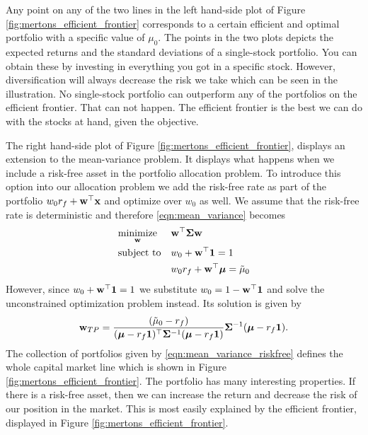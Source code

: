 \documentclass[oneside]{book}\usepackage{knitr}
\begin{document}
Any point on any of the two lines in the left hand-side plot of Figure \ref{fig:mertons_efficient_frontier} corresponds to a certain efficient and optimal portfolio with a specific value of $\mu_0$. 
The points in the two plots depicts the expected returns and the standard deviations of a single-stock portfolio. 
You can obtain these by investing in everything you got in a specific stock. 
However, diversification will always decrease the risk we take which can be seen in the illustration. 
No single-stock portfolio can outperform any of the portfolios on the efficient frontier. 
That can not happen. 
The efficient frontier is the best we can do with the stocks at hand, given the objective.

The right hand-side plot of Figure \ref{fig:mertons_efficient_frontier}, displays an extension to the mean-variance problem.
It displays what happens when we include a risk-free asset in the portfolio allocation problem. 
To introduce this option into our allocation problem we add the risk-free rate as part of the portfolio $w_0 r_f + \mathbf{w}^\top \mathbf{x}$ and optimize over $w_0$ as well. 
We assume that the risk-free rate is deterministic and therefore \eqref{eqn:mean_variance} becomes 
\begin{equation}\label{eqn:mean_variance_riskfree}
\begin{aligned}
& \underset{\mathbf{w}}{\text{minimize}} 
& & \mathbf{w}^\top \mathbf{\Sigma} \mathbf{w} \\
& \text{subject to}
& & w_0 + \mathbf{w}^\top \mathbf{1} = 1 \\
& && w_0 r_f + \mathbf{w}^\top \mbox{\boldmath$\mu$} = \tilde\mu_0 \\
\end{aligned}
\end{equation}
However, since $w_0 + \mathbf{w}^\top \mathbf{1}=1$ we substitute $w_0=1-\mathbf{w}^\top \mathbf{1}$ and solve the unconstrained optimization problem instead. 
Its solution is given by 
\begin{equation}\label{eqn:w_mean_variance_riskfree}
  \mathbf{w}_{TP} = \frac{(\tilde\mu_0-r_f)}{(\mbox{\boldmath$\mu$}-r_f \mathbf{1})^\top \mathbf{\Sigma}^{-1} (\mbox{\boldmath$\mu$}-r_f \mathbf{1})} \mathbf{\Sigma}^{-1} (\mbox{\boldmath$\mu$}-r_f \mathbf{1}).
\end{equation}
The collection of portfolios given by \eqref{eqn:mean_variance_riskfree} defines the whole capital market line which is shown in Figure \ref{fig:mertons_efficient_frontier}. 
The portfolio has many interesting properties. 
If there is a risk-free asset, then we can increase the return and decrease the risk of our position in the market. 
This is most easily explained by the efficient frontier, displayed in Figure \ref{fig:mertons_efficient_frontier}. 
\end{document}
